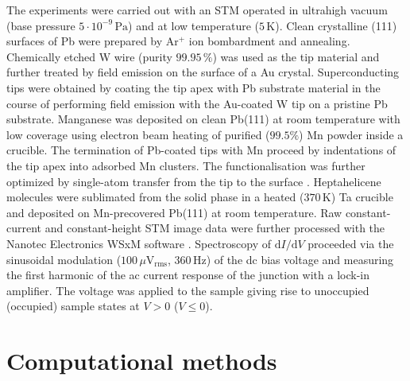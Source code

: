 \documentclass[aps,floatfix,12pt]{revtex4-2}
\begin{document}
The experiments were carried out with an STM operated in ultrahigh vacuum (base pressure $5\cdot 10^{-9}\,\text{Pa}$) and at low temperature ($5\,\text{K}$)\@.
Clean crystalline (111) surfaces of Pb were prepared by Ar$^+$ ion bombardment and annealing.
Chemically etched W wire (purity $99.95\,\%$) was used as the tip material and further treated by field emission on the surface of a Au crystal.
Superconducting tips were obtained by coating the tip apex with Pb substrate material in the course of performing field emission with the Au-coated W tip on a pristine Pb substrate.
Manganese was deposited on clean Pb(111) at room temperature with low coverage using electron beam heating of purified ($99.5 \%$) Mn powder inside a crucible.
The termination of Pb-coated tips with Mn proceed by indentations of the tip apex into adsorbed Mn clusters.
The functionalisation was further optimized by single-atom transfer from the tip to the surface \cite{prl_94_126102,jpcm_20_223001}.
Heptahelicene molecules were sublimated from the solid phase in a heated ($370\,\text{K}$) Ta crucible and deposited on Mn-precovered Pb(111) at room temperature.
Raw constant-current and constant-height STM image data were further processed with the Nanotec Electronics WSxM software \cite{rsi_78_013705}.
Spectroscopy of $\text{d}I/\text{d}V$ proceeded via the sinusoidal modulation ($100\,\mu\text{V}_{\text{rms}}$, $360\,\text{Hz}$) of the dc bias voltage and measuring the first harmonic of the ac current response of the junction with a lock-in amplifier.
The voltage was applied to the sample giving rise to unoccupied (occupied) sample states at $V>0$ ($V\leq 0$)\@.

\section*{Computational methods}
\end{document}
